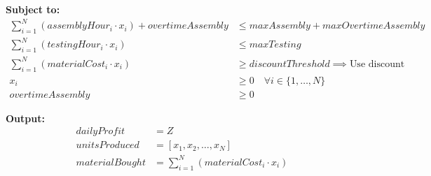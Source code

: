 \documentclass{article}
\begin{document}
\textbf{Subject to:}
\begin{align*}
    \sum_{i=1}^N (assemblyHour_i \cdot x_i) + overtimeAssembly &\leq maxAssembly + maxOvertimeAssembly \\
    \sum_{i=1}^N (testingHour_i \cdot x_i) &\leq maxTesting \\
    \sum_{i=1}^N (materialCost_i \cdot x_i) &\geq discountThreshold \implies \text{Use discount} \\
    x_i &\geq 0 \quad \forall i \in \{1, \ldots, N\} \\
    overtimeAssembly &\geq 0
\end{align*}

\textbf{Output:}
\begin{align*}
    dailyProfit &= Z \\
    unitsProduced &= [x_1, x_2, \ldots, x_N] \\
    materialBought &= \sum_{i=1}^N (materialCost_i \cdot x_i)
\end{align*}
\end{document}
